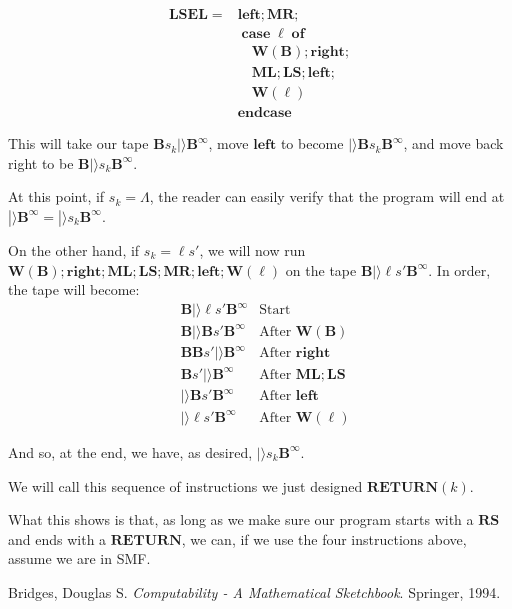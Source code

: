 \documentclass{article}
\newcommand{\B}{\mathbf{B}}
\DeclareMathOperator{\Ncase}{\mathbf{case}}
\DeclareMathOperator{\Nof}{\mathbf{of}}
\DeclareMathOperator{\Nendcase}{\mathbf{endcase}}
\newcommand{\MR}{\mathbf{MR}}
\newcommand{\ML}{\mathbf{ML}}
\newcommand{\W}{\mathbf{W}}
\newcommand{\RS}{\mathbf{RS}}
\newcommand{\LS}{\mathbf{LS}}
\newcommand{\LSEL}{\mathbf{LSEL}}
\newcommand{\Oright}{\mathbf{right}}
\newcommand{\Oleft}{\mathbf{left}}
\newcommand{\RETURN}{\mathbf{RETURN}}
\begin{document}
	\begin{align*}
	\LSEL =& \Oleft; \MR;\\
	&\Ncase \ell \Nof\\
	&\quad \W(\B); \Oright;\\
	&\quad \ML; \LS; \Oleft;\\
	&\quad \W(\ell)\\
	&\Nendcase
	\end{align*}
	
	This will take our tape $\B s_k |\rangle \B^\infty$, move $\Oleft$ to become $|\rangle \B s_k \B^\infty$, and move back right to be $\B |\rangle s_k \B^\infty$.
	
	At this point, if $s_k = \Lambda$, the reader can easily verify that the program will end at $|\rangle \B^\infty = |\rangle s_k \B^\infty$.
	
	On the other hand, if $s_k = \ell s'$, we will now run $\W(\B); \Oright; \ML; \LS; \MR; \Oleft; \W(\ell)$ on the tape $\B |\rangle \ell s' \B^\infty$. In order, the tape will become:
	\begin{align*}
	&\B |\rangle \ell s' \B^\infty &\text{Start}\\
	&\B |\rangle \B s' \B^\infty &\text{After $\W(\B)$}\\
	&\B \B s' |\rangle \B^\infty &\text{After $\Oright$}\\
	&\B s' |\rangle \B^\infty &\text{After $\ML; \LS$}\\
	&|\rangle \B s' \B^\infty &\text{After $\Oleft$}\\
	&|\rangle \ell s' \B^\infty &\text{After $\W(\ell)$}
	\end{align*}
	
	And so, at the end, we have, as desired, $|\rangle s_k \B^\infty$.
	
	
	We will call this sequence of instructions we just designed $\RETURN(k)$.
	
	What this shows is that, as long as we make sure our program starts with a $\RS$ and ends with a $\RETURN$, we can, if we use the four instructions above, assume we are in SMF.
	
\begin{thebibliography}{9}
Bridges, Douglas S.
\textit{Computability - A Mathematical Sketchbook}. 
Springer, 1994. %
\end{thebibliography}	
\end{document}

